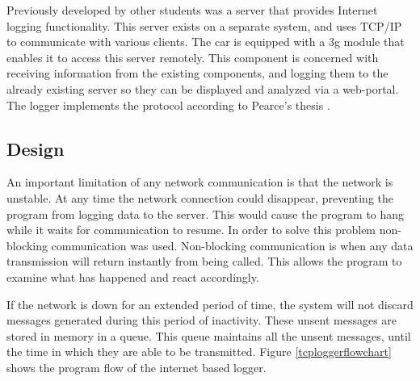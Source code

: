 Previously developed by other students was a server that provides Internet logging functionality. This server exists on a separate system, and uses TCP/IP to communicate with various clients. The car is equipped with a 3g module that enables it to access this server remotely. This component is concerned with receiving information from the existing components, and logging them to the already existing server so they can be displayed and analyzed via a web-portal. The logger implements the protocol according to Pearce's thesis \cite{john_thesis}.

\subsection {Design}

An important limitation of any network communication is that the network is unstable. At any time the network connection could disappear, preventing the program from logging data to the server. This would cause the program to hang while it waits for communication to resume. In order to solve this problem non-blocking communication was used. Non-blocking communication is when any data transmission will return instantly from being called. This allows the program to examine what has happened and react accordingly.

If the network is down for an extended period of time, the system will not discard messages generated during this period of inactivity. These unsent messages are stored in memory in a queue. This queue maintains all the unsent messages, until the time in which they are able to be transmitted. Figure \ref{tcploggerflowchart} shows the program flow of the internet based logger.






